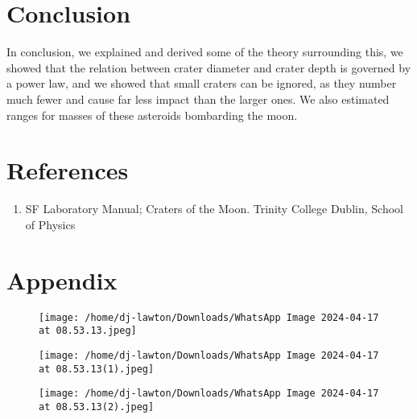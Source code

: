 \documentclass{article}
\begin{document}
\section{Conclusion}
In conclusion, we explained and derived some of the theory surrounding this, we showed that the relation between crater diameter and crater depth is governed by a power law, and we showed that small craters can be ignored, as they number much fewer and cause far less impact than the larger ones. We also estimated ranges for masses of these asteroids bombarding the moon.
\section{References}
\begin{enumerate}
\item SF Laboratory Manual; Craters of the Moon. Trinity College Dublin, School of Physics
\end{enumerate}
\section{Appendix}
\begin{figure}[H]
\begin{center}
\texttt{[image: /home/dj-lawton/Downloads/WhatsApp Image 2024-04-17 at 08.53.13.jpeg]}
\end{center}
\end{figure}
\begin{figure}[H]
\begin{center}
\texttt{[image: /home/dj-lawton/Downloads/WhatsApp Image 2024-04-17 at 08.53.13(1).jpeg]}
\end{center}
\end{figure}
\begin{figure}[H]
\begin{center}
\texttt{[image: /home/dj-lawton/Downloads/WhatsApp Image 2024-04-17 at 08.53.13(2).jpeg]}
\end{center}
\end{figure}
\end{document}
